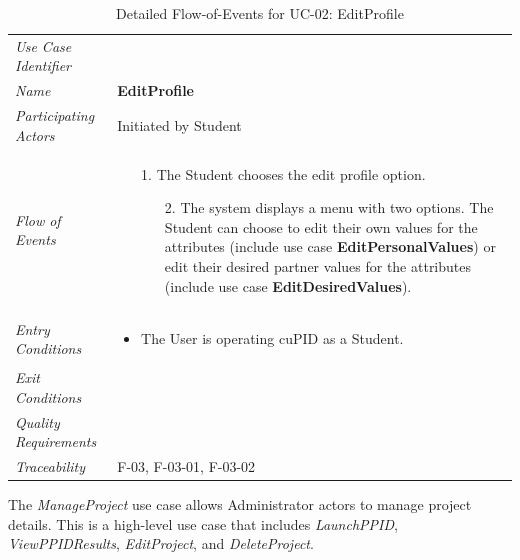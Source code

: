 \documentclass[12pt,letterpaper]{article}
\begin{document}
\begin{table}[H]
	\caption{Detailed Flow-of-Events for UC-02: EditProfile}
	\begin{tabu} to 
		\toprule
		Use Case Identifier & \editprofile{} \\
		Name & {\bf EditProfile} \\
		Participating Actors & Initiated by Student \\
		Flow of Events & 
		\begin{minipage}[t]{\linewidth}
		    \begin{enumerate}
		    		\item[1.] The Student chooses the edit profile option.
		    		\begin{enumerate}
			    		\item[2.] The system displays a menu with two options. The Student can choose to edit their own values for the attributes (include use case \textbf{EditPersonalValues}) or edit their desired partner values for the attributes (include use case \textbf{EditDesiredValues}).
		    		\end{enumerate}
			\end{enumerate}
		\end{minipage} \\

		Entry Conditions &
		\begin{minipage}[t]{\linewidth}
			\begin{itemize}
			    \item The User is operating cuPID as a Student.
	        \end{itemize}
		\end{minipage} \\

		Exit Conditions & \\

		Quality Requirements & \\

		Traceability &  F-03, F-03-01, F-03-02 \\
		\toprule
	\end{tabu}
\end{table}

The {\it ManageProject} use case allows Administrator actors to manage project details. This is a high-level use case that
includes {\it LaunchPPID}, {\it ViewPPIDResults}, {\it EditProject}, and {\it DeleteProject}.
\end{document}
